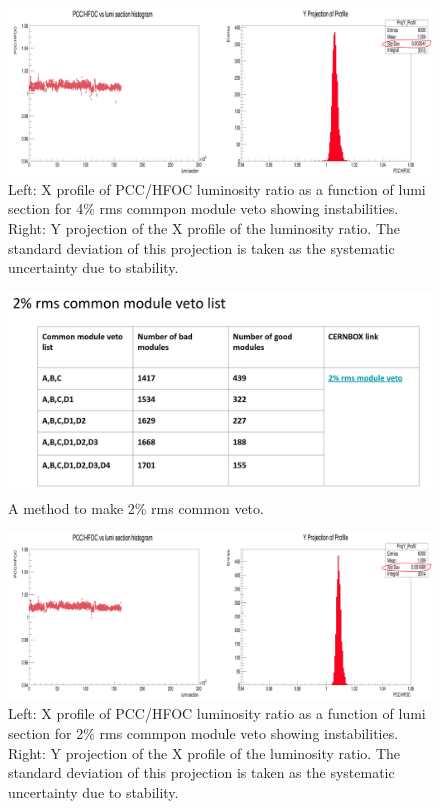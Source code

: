 \begin{figure}[!htp]
\centering
\includegraphics[width=1\textwidth]{ashish_thesis/pcc_hfoc_ratio_stability_4per_common_veto.png}
\caption{%
   Left: X profile of PCC/HFOC luminosity ratio as a function of lumi section for 4\% rms commpon module veto showing instabilities.  Right: Y projection of the X profile of the luminosity ratio. The standard deviation of this projection is taken as the systematic uncertainty due to stability.
}
\label{fig:4per common veto sys}
\end{figure}



\begin{figure}[!htp]
\centering
\includegraphics[width=1\textwidth]{ashish_thesis/2per_rms_common_veto.png}
\caption{%
   A method to make 2\% rms common veto.
}
\label{fig:2per common veto}
\end{figure}

\begin{figure}[!htp]
\centering
\includegraphics[width=1\textwidth]{ashish_thesis/pcc_hfoc_ratio_stability_2per_common_veto.png}
\caption{%
   Left: X profile of PCC/HFOC luminosity ratio as a function of lumi section for 2\% rms commpon module veto showing instabilities.  Right: Y projection of the X profile of the luminosity ratio. The standard deviation of this projection is taken as the systematic uncertainty due to stability.
}
\label{fig:2per common veto pcc hfoc}
\end{figure}

